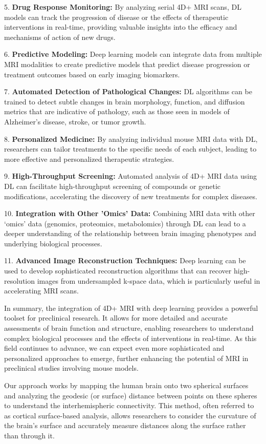 \documentclass[twocolumn]{article}
\begin{document}
5. \textbf{Drug Response Monitoring:}
By analyzing serial 4D+ MRI scans, DL models can track the progression of disease or the effects of therapeutic interventions in real-time, providing valuable insights into the efficacy and mechanisms of action of new drugs.

6. \textbf{Predictive Modeling:}
Deep learning models can integrate data from multiple MRI modalities to create predictive models that predict disease progression or treatment outcomes based on early imaging biomarkers.

7. \textbf{Automated Detection of Pathological Changes:}
DL algorithms can be trained to detect subtle changes in brain morphology, function, and diffusion metrics that are indicative of pathology, such as those seen in models of Alzheimer's disease, stroke, or tumor growth.

8. \textbf{Personalized Medicine:}
By analyzing individual mouse MRI data with DL, researchers can tailor treatments to the specific needs of each subject, leading to more effective and personalized therapeutic strategies.

9. \textbf{High-Throughput Screening:}
Automated analysis of 4D+ MRI data using DL can facilitate high-throughput screening of compounds or genetic modifications, accelerating the discovery of new treatments for complex diseases.

10. \textbf{Integration with Other 'Omics' Data:}
Combining MRI data with other `omics' data (genomics, proteomics, metabolomics) through DL can lead to a deeper understanding of the relationship between brain imaging phenotypes and underlying biological processes.

11. \textbf{Advanced Image Reconstruction Techniques:}
Deep learning can be used to develop sophisticated reconstruction algorithms that can recover high-resolution images from undersampled k-space data, which is particularly useful in accelerating MRI scans.

In summary, the integration of 4D+ MRI with deep learning provides a powerful toolset for preclinical research. It allows for more detailed and accurate assessments of brain function and structure, enabling researchers to understand complex biological processes and the effects of interventions in real-time. As this field continues to advance, we can expect even more sophisticated and personalized approaches to emerge, further enhancing the potential of MRI in preclinical studies involving mouse models.

Our approach works by mapping the human brain onto two spherical surfaces and analyzing the geodesic (or surface) distance between points on these spheres to understand the interhemispheric connectivity. This method, often referred to as cortical surface-based analysis, allows researchers to consider the curvature of the brain's surface and accurately measure distances along the surface rather than through it. 
\end{document}
